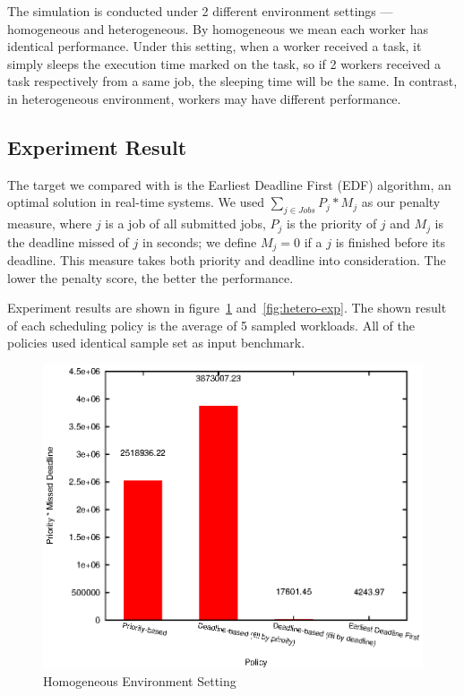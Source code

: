 The simulation is conducted under 2 different environment settings ---
homogeneous and heterogeneous.
By homogeneous we mean each worker has identical performance.
Under this setting, when a worker received a task, it simply sleeps the
execution time marked on the task, so if 2 workers received a task
respectively from a same job, the sleeping time will be the same.
In contrast, in heterogeneous environment, workers may have different
performance.

\subsection{Experiment Result}

The target we compared with is the Earliest Deadline First (EDF)
algorithm, an optimal solution in real-time systems.
We used $\sum_{j \in Jobs} P_j * M_j$ as our penalty measure, where $j$
is a job of all submitted jobs, $P_j$ is the priority of $j$ and $M_j$
is the deadline missed of $j$ in seconds; we define $M_j = 0$ if a $j$
is finished before its deadline.
This measure takes both priority and deadline into consideration.
The lower the penalty score, the better the performance.

Experiment results are shown in figure~\ref{fig:homo-exp}
and~\ref{fig:hetero-exp}.
The shown result of each scheduling policy is the average of 5 sampled
workloads.
All of the policies used identical sample set as input benchmark.

\begin{figure}[htbp]
  \centering
  \includegraphics[width=\textwidth,height=0.7\textheight,keepaspectratio]{figures/homo.eps}
  \caption{Homogeneous Environment Setting}
  \label{fig:homo-exp}
\end{figure}

